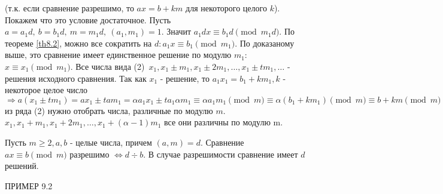     (т.к. если сравнение разрешимо, то $ax=b+km$ для некоторого целого $k$). Покажем что это условие достаточное. Пусть $a=a_1d,\ b=b_1d,\ m=m_1d,\ (a_1,m_1)=1$. Значит $a_1dx\equiv b_1d\pmod{m_1d}$. По теореме \ref{th8.2}, можно все сократить на $d: a_1x\equiv b_1\pmod{m_1}$. По доказаному выше, это сравнение имеет единственное решение по модулю $m_1$: $x\equiv x_1\pmod{m_1}$. Все числа вида (2)\ $x_1, x_1\pm m_1, x_1\pm 2m_1, \dots, x_1\pm tm_1,\dots$ - решения исходного сравнения. Так как $x_1$ - решение, то $a_1x_1=b_1+km_1, k$ - некоторое целое число $\Rightarrow a(x_1\pm tm_1)=ax_1\pm tam_1=\alpha a_1 x_1 \pm t a_1 \alpha m_1 \equiv \alpha a_1 m_1 \pmod{m}\equiv \alpha(b_1+km_1)\pmod{m}\equiv b+km \pmod{m}\equiv b\pmod{m} \Rightarrow$ из ряда (2) нужно отобрать числа, различные по модулю $m$. $x_1,x_1+m_1,x_1+2m_1,\dots,x_1+(\alpha-1)m_1$ все они различны по модулю m.
    \begin{theorem}\label{th9.1}
        Пусть $m\geq 2, a,b$ - целые числа, причем $(a,m)=d$. Сравнение $ax\equiv b \pmod{m}$ разрешимо $\Leftrightarrow d\div b$. В случае разрешимости сравнение имеет $d$ решений.
    \end{theorem} 
    \begin{example}
        ПРИМЕР 9.2    
    \end{example}
